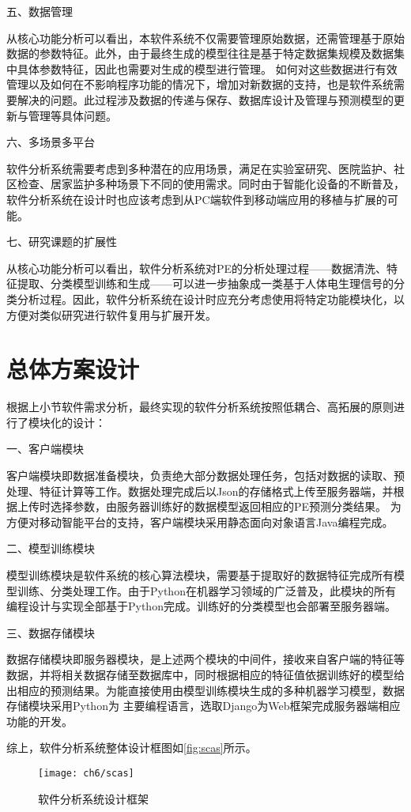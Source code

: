五、数据管理

从核心功能分析可以看出，本软件系统不仅需要管理原始数据，还需管理基于原始数据的参数特征。此外，由于最终生成的模型往往是基于特定数据集规模及数据集中具体参数特征，因此也需要对生成的模型进行管理。
如何对这些数据进行有效管理以及如何在不影响程序功能的情况下，增加对新数据的支持，也是软件系统需要解决的问题。此过程涉及数据的传递与保存、数据库设计及管理与预测模型的更新与管理等具体问题。

六、多场景多平台

软件分析系统需要考虑到多种潜在的应用场景，满足在实验室研究、医院监护、社区检查、居家监护多种场景下不同的使用需求。同时由于智能化设备的不断普及，软件分析系统在设计时也应该考虑到从PC端软件到移动端应用的移植与扩展的可能。

七、研究课题的扩展性

从核心功能分析可以看出，软件分析系统对PE的分析处理过程——数据清洗、特征提取、分类模型训练和生成——可以进一步抽象成一类基于人体电生理信号的分类分析过程。因此，软件分析系统在设计时应充分考虑使用将特定功能模块化，以方便对类似研究进行软件复用与扩展开发。

\section{总体方案设计}
根据上小节软件需求分析，最终实现的软件分析系统按照低耦合、高拓展的原则进行了模块化的设计：

一、客户端模块

客户端模块即数据准备模块，负责绝大部分数据处理任务，包括对数据的读取、预处理、特征计算等工作。数据处理完成后以Json的存储格式上传至服务器端，并根据上传时选择参数，由服务器训练好的数据模型返回相应的PE预测分类结果。
为方便对移动智能平台的支持，客户端模块采用静态面向对象语言Java编程完成。

二、模型训练模块

模型训练模块是软件系统的核心算法模块，需要基于提取好的数据特征完成所有模型训练、分类处理工作。由于Python在机器学习领域的广泛普及，此模块的所有编程设计与实现全部基于Python完成。训练好的分类模型也会部署至服务器端。

三、数据存储模块

数据存储模块即服务器模块，是上述两个模块的中间件，接收来自客户端的特征等数据，并将相关数据存储至数据库中，同时根据相应的特征值依据训练好的模型给出相应的预测结果。为能直接使用由模型训练模块生成的多种机器学习模型，数据存储模块采用Python为
主要编程语言，选取Django为Web框架完成服务器端相应功能的开发。

综上，软件分析系统整体设计框图如\autoref{fig:scas}所示。
\begin{figure}[htbp]
    \centering
    \texttt{[image: ch6/scas]}
    \caption{\label{fig:scas}软件分析系统设计框架}
\end{figure}

